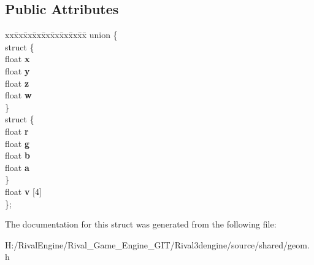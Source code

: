 \subsection*{Public Attributes}
\begin{DoxyCompactItemize}
\item 
\mbox{\label{structvec4_a6aee3d06557b39590b75e50f0942c258}} 
\begin{tabbing}
xx\=xx\=xx\=xx\=xx\=xx\=xx\=xx\=xx\=\kill
union \{\\
\mbox{\label{unionvec4_1_1_0D179_a703380485e71406948fc07fa0ede4ef0}} 
\>struct \{\\
\>\>float {\bfseries x}\\
\>\>float {\bfseries y}\\
\>\>float {\bfseries z}\\
\>\>float {\bfseries w}\\
\>\} \\
\mbox{\label{unionvec4_1_1_0D179_ac8e03aebc732d1f95a25d6b153c52fb1}} 
\>struct \{\\
\>\>float {\bfseries r}\\
\>\>float {\bfseries g}\\
\>\>float {\bfseries b}\\
\>\>float {\bfseries a}\\
\>\} \\
\>float {\bfseries v} \mbox{[}4\mbox{]}\\
\}; \\

\end{tabbing}\end{DoxyCompactItemize}


The documentation for this struct was generated from the following file\+:\begin{DoxyCompactItemize}
\item 
H\+:/\+Rival\+Engine/\+Rival\+\_\+\+Game\+\_\+\+Engine\+\_\+\+G\+I\+T/\+Rival3dengine/source/shared/geom.\+h\end{DoxyCompactItemize}
